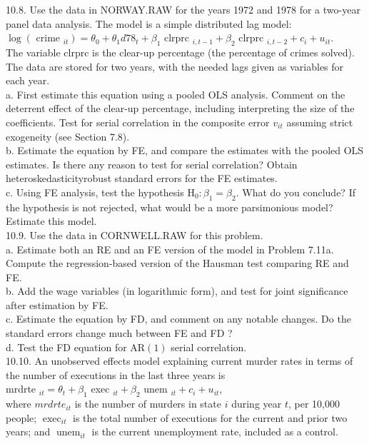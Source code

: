 \documentclass[10pt]{article}
\begin{document}
10.8. Use the data in NORWAY.RAW for the years 1972 and 1978 for a two-year panel data analysis. The model is a simple distributed lag model:\\
$\log \left(\right.$ crime $\left._{i t}\right)=\theta_{0}+\theta_{1} d 78_{t}+\beta_{1}$ clrprc $_{i, t-1}+\beta_{2}$ clrprc $_{i, t-2}+c_{i}+u_{i t}$.\\
The variable clrprc is the clear-up percentage (the percentage of crimes solved). The data are stored for two years, with the needed lags given as variables for each year.\\
a. First estimate this equation using a pooled OLS analysis. Comment on the deterrent effect of the clear-up percentage, including interpreting the size of the coefficients. Test for serial correlation in the composite error $v_{i t}$ assuming strict exogeneity (see Section 7.8).\\
b. Estimate the equation by FE, and compare the estimates with the pooled OLS estimates. Is there any reason to test for serial correlation? Obtain heteroskedasticityrobust standard errors for the FE estimates.\\
c. Using FE analysis, test the hypothesis $\mathrm{H}_{0}: \beta_{1}=\beta_{2}$. What do you conclude? If the hypothesis is not rejected, what would be a more parsimonious model? Estimate this model.\\
10.9. Use the data in CORNWELL.RAW for this problem.\\
a. Estimate both an RE and an FE version of the model in Problem 7.11a. Compute the regression-based version of the Hausman test comparing RE and FE.\\
b. Add the wage variables (in logarithmic form), and test for joint significance after estimation by FE.\\
c. Estimate the equation by FD, and comment on any notable changes. Do the standard errors change much between FE and FD ?\\
d. Test the FD equation for $\mathrm{AR}(1)$ serial correlation.\\
10.10. An unobserved effects model explaining current murder rates in terms of the number of executions in the last three years is\\
mrdrte $_{i t}=\theta_{t}+\beta_{1}$ exec $_{i t}+\beta_{2}$ unem $_{i t}+c_{i}+u_{i t}$,\\
where $m r d r t e_{i t}$ is the number of murders in state $i$ during year $t$, per 10,000 people; $\operatorname{exec}_{i t}$ is the total number of executions for the current and prior two years; and $\operatorname{unem}_{i t}$ is the current unemployment rate, included as a control.\\
\end{document}
